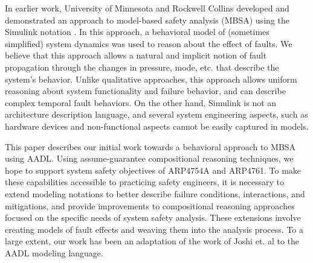 In earlier work, University of Minnesota and Rockwell Collins developed and demonstrated an approach to model-based safety analysis (MBSA) \cite {Joshi05:Dasc,Joshi05:SafeComp,NasaRep:MBSA-Aug05} using the Simulink notation \cite{MathWorks}.  In this approach, a behavioral model of (sometimes simplified) system dynamics was used to reason about the effect of faults.  We believe that this approach allows a natural and implicit notion of fault propagation through the changes in pressure, mode, etc. that describe the system's behavior.  Unlike qualitative approaches, this approach allows uniform reasoning about system functionality and failure behavior, and can describe complex temporal fault behaviors.  On the other hand, Simulink is not an architecture description language, and several system engineering aspects, such as hardware devices and non-functional aspects cannot be easily captured in models.

\iffalse
Over the last five years, several research groups have focused on formal reasoning at the system architecture level, resulting in MBSE tools that incorporate assume-guarantee compositional reasoning techniques~\cite{Trento and Rockwell and UMN}.  These tools allow behavioral reasoning about complex system models, but with substantially greater scalability than previous approaches.
\fi

This paper describes our initial work towards a behavioral approach to MBSA using AADL.  Using assume-guarantee compositional reasoning techniques, we hope to support system safety objectives of ARP4754A and ARP4761.  To make these capabilities accessible to practicing safety engineers, it is necessary to extend modeling notations to better describe failure conditions, interactions, and mitigations, and provide improvements to compositional reasoning approaches focused on the specific needs of system safety analysis.  These extensions involve creating models of fault effects and weaving them into the analysis process.  To a large extent, our work has been an adaptation of the work of Joshi et. al to the AADL modeling language.

\iffalse
This paper describes our initial work towards a behavioral approach to MBSA using AADL. In previous work we have extended the AADL language to add formal assume-guarantee contracts to specify behavioral requirements and compositional reasoning about system behavior.  Compared to the existing AADL Error Model Annex, these contracts provide a better, more natural, and more effective way to describe fault propagation and system behavior in the presence of failures.  To make these capabilities accessible to practicing safety engineers, it is necessary to extend modeling notations to better describe failure conditions, interactions, and mitigations, and provide improvements to compositional reasoning approaches focused on the specific needs of system safety analysis. These extensions involve creating models of fault effects and weaving them into the analysis process. To a large extent, our work has been an adaptation of the work of Joshi et. al to the AADL modeling language.
\fi


